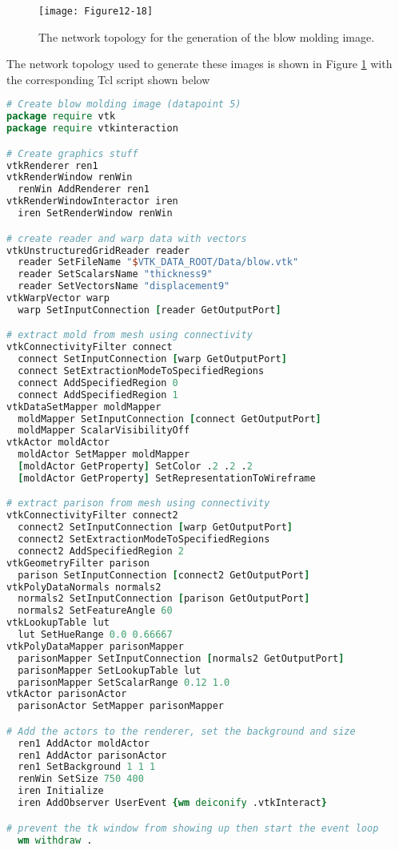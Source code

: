 \begin{figure}[!htb]
	\centering
	\texttt{[image: Figure12-18]}
	\caption{The network topology for the generation of the blow molding image.}
	\label{fig:Figure12-18}
\end{figure}

The network topology used to generate these images is shown in Figure \ref{fig:Figure12-18} with the corresponding Tcl script shown below

\begin{lstlisting}[language=TCL, caption={Script to generate the blow molding image.}]
# Create blow molding image (datapoint 5)
package require vtk
package require vtkinteraction

# Create graphics stuff
vtkRenderer ren1
vtkRenderWindow renWin
  renWin AddRenderer ren1
vtkRenderWindowInteractor iren
  iren SetRenderWindow renWin

# create reader and warp data with vectors
vtkUnstructuredGridReader reader
  reader SetFileName "$VTK_DATA_ROOT/Data/blow.vtk"
  reader SetScalarsName "thickness9"
  reader SetVectorsName "displacement9"
vtkWarpVector warp
  warp SetInputConnection [reader GetOutputPort]

# extract mold from mesh using connectivity
vtkConnectivityFilter connect
  connect SetInputConnection [warp GetOutputPort]
  connect SetExtractionModeToSpecifiedRegions
  connect AddSpecifiedRegion 0
  connect AddSpecifiedRegion 1
vtkDataSetMapper moldMapper
  moldMapper SetInputConnection [connect GetOutputPort]
  moldMapper ScalarVisibilityOff
vtkActor moldActor
  moldActor SetMapper moldMapper
  [moldActor GetProperty] SetColor .2 .2 .2
  [moldActor GetProperty] SetRepresentationToWireframe

# extract parison from mesh using connectivity
vtkConnectivityFilter connect2
  connect2 SetInputConnection [warp GetOutputPort]
  connect2 SetExtractionModeToSpecifiedRegions
  connect2 AddSpecifiedRegion 2
vtkGeometryFilter parison
  parison SetInputConnection [connect2 GetOutputPort]
vtkPolyDataNormals normals2
  normals2 SetInputConnection [parison GetOutputPort]
  normals2 SetFeatureAngle 60
vtkLookupTable lut
  lut SetHueRange 0.0 0.66667
vtkPolyDataMapper parisonMapper
  parisonMapper SetInputConnection [normals2 GetOutputPort]
  parisonMapper SetLookupTable lut
  parisonMapper SetScalarRange 0.12 1.0
vtkActor parisonActor
  parisonActor SetMapper parisonMapper

# Add the actors to the renderer, set the background and size
  ren1 AddActor moldActor
  ren1 AddActor parisonActor
  ren1 SetBackground 1 1 1
  renWin SetSize 750 400
  iren Initialize
  iren AddObserver UserEvent {wm deiconify .vtkInteract}

# prevent the tk window from showing up then start the event loop
  wm withdraw .
\end{lstlisting}

